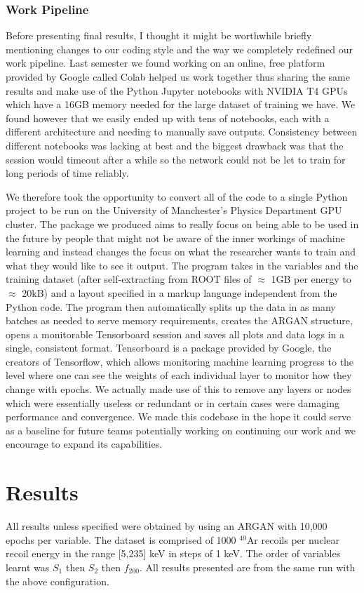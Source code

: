 \documentclass[11pt]{article} %
\begin{document}
\subsubsection{Work Pipeline}
Before presenting final results, I thought it might be worthwhile briefly mentioning changes to our
coding style and the way we completely redefined our work pipeline.
Last semester we found working on an online, free platform provided by Google called Colab helped us work together thus sharing the same results
and make use of the Python Jupyter notebooks with NVIDIA T4 GPUs which have a 16GB memory needed for the large dataset of training we have.
We found however that we easily ended up with tens of notebooks, each with a different architecture and needing to manually save outputs.
Consistency between different notebooks was lacking at best and the biggest drawback was that the session would timeout after a while so the network could not
be let to train for long periods of time reliably.
\\
\par We therefore took the opportunity to convert all of the code to a single Python project to be run on the University of Manchester's Physics Department GPU cluster.
The package we produced aims to really focus on being able to be used in the future by people that might not be aware of the inner workings of machine learning
and instead changes the focus on what the researcher wants to train and what they would like to see it output.
The program takes in the variables and the training dataset (after self-extracting from ROOT files of $\approx$ 1GB per energy to $\approx$ 20kB)
and a layout specified in a markup language independent from the Python code.
The program then automatically splits up the data in as many batches as needed to serve memory requirements, creates the ARGAN structure, opens a monitorable
Tensorboard session and saves all plots and data logs in a single, consistent format.
Tensorboard is a package provided by Google, the creators of Tensorflow, which allows monitoring machine learning progress to the level
where one can see the weights of each individual layer to monitor how they change with epochs.
We actually made use of this to remove any layers or nodes which were essentially useless or redundant or in certain cases were damaging performance and convergence.
We made this codebase in the hope it could serve as a baseline for future teams potentially working on continuing our work and we encourage to expand its capabilities.
\section{Results}
All results unless specified were obtained by using an ARGAN with 10,000 epochs per variable.
The dataset is comprised of 1000 $^{40}\mathrm{\text{Ar}}$ recoils per nuclear recoil energy in the range [5,235] keV in steps of 1 keV.
The order of variables learnt was $S_1$ then $S_2$ then $f_{200}$.
All results presented are from the same run with the above configuration.
\end{document}
